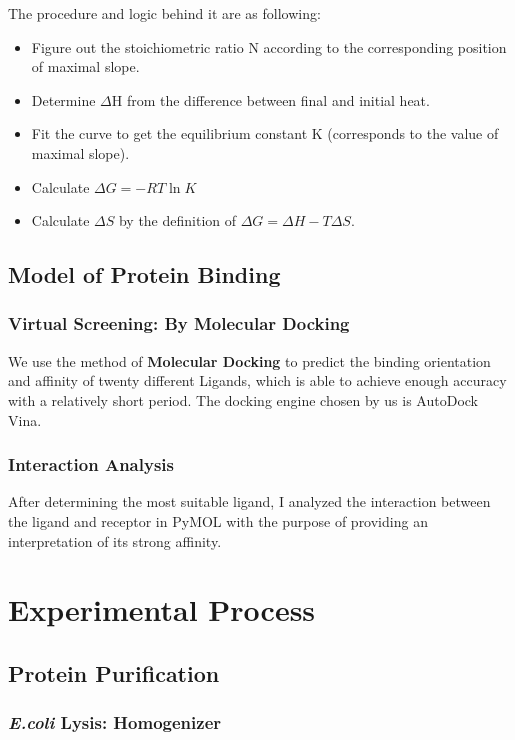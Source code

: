 \documentclass{report}
\begin{document}
The procedure and logic behind it are as following:
\begin{itemize}
    \item Figure out the stoichiometric ratio N according to the corresponding position of maximal slope.
    \item Determine $\Delta$H from the difference between final and initial heat.
    \item Fit the curve to get the equilibrium constant K (corresponds to the value of maximal slope).
    \item Calculate $\Delta G=-RT\ln K$
    \item Calculate $\Delta S$ by the definition of $\Delta G=\Delta H -T\Delta S$.
\end{itemize}
\section{Model of Protein Binding}
\subsection{Virtual Screening: By Molecular Docking}
We use the method of \textbf{Molecular Docking} to predict the binding orientation and affinity of twenty different Ligands, which is able to achieve enough accuracy with a relatively short period.
The docking engine chosen by us is AutoDock Vina.
\subsection{Interaction Analysis}
After determining the most suitable ligand, I analyzed the interaction between the ligand and receptor in PyMOL with the purpose of providing an interpretation of its strong affinity. 

\chapter{Experimental Process}
\section{Protein Purification}
\subsection{\textit{E.coli} Lysis: Homogenizer}
\end{document}
